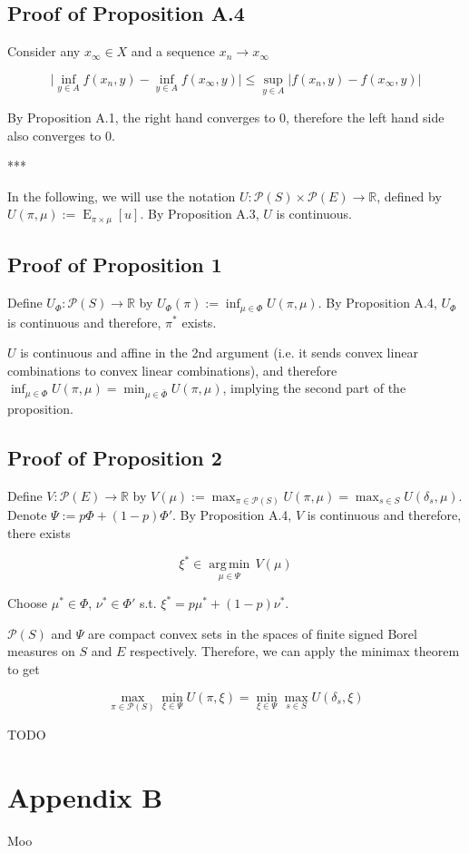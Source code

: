 \documentclass[a4paper]{article}
\DeclareMathOperator{\E}{E}
\newcommand{\Argmin}[1]{\underset{#1}{\operatorname{arg\,min}}\,}
\newcommand{\Reals}{\mathbb{R}}
\newcommand{\Abs}[1]{\lvert #1 \rvert}
\newcommand{\Prob}{\mathcal{P}}
\begin{document}
\subsection{Proof of Proposition A.4}

Consider any ${x_\infty \in X}$ and a sequence ${x_n \rightarrow x_\infty}$

$$\Abs{\inf_{y \in A} f(x_n,y) - \inf_{y \in A} f(x_\infty,y)} \leq \sup_{y \in A} \Abs{f(x_n,y) - f(x_\infty,y)}$$

By Proposition A.1, the right hand converges to 0, therefore the left hand side also converges to 0.

***

In the following, we will use the notation ${U: \Prob(S) \times \Prob(E) \rightarrow \Reals}$, defined by ${U(\pi,\mu):=\E_{\pi \times \mu}[u]}$. By Proposition A.3, ${U}$ is continuous. 

\subsection{Proof of Proposition 1}

Define ${U_\Phi: \Prob(S) \rightarrow \Reals}$ by ${U_\Phi(\pi):= \inf_{\mu \in \Phi} U(\pi,\mu)}$. By Proposition A.4, ${U_{\Phi}}$ is continuous and therefore, ${\pi^*}$ exists.

${U}$ is continuous and affine in the 2nd argument (i.e. it sends convex linear combinations to convex linear combinations), and therefore ${\inf_{\mu \in \Phi} U(\pi,\mu)=\min_{\mu \in \bar{\Phi}} U(\pi,\mu)}$, implying the second part of the proposition.

\subsection{Proof of Proposition 2}

Define ${V: \Prob(E) \rightarrow \Reals}$ by ${V(\mu):=\max_{\pi \in \Prob(S)} U(\pi,\mu)=\max_{s \in S} U(\delta_s,\mu)}$. Denote ${\Psi:=p\Phi + (1-p)\Phi'}$. By Proposition A.4, ${V}$ is continuous and therefore, there exists

$$\xi^* \in \Argmin{\mu \in \Psi} V(\mu)$$

Choose ${\mu^* \in \Phi}$, ${\nu^* \in \Phi'}$ s.t. ${\xi^* = p \mu^* + (1-p) \nu^*}$.

${\Prob(S)}$ and ${\Psi}$ are compact convex sets in the spaces of finite signed Borel measures on ${S}$ and ${E}$ respectively. Therefore, we can apply the minimax theorem to get

$$\max_{\pi \in \Prob(S)} \min_{\xi \in \Psi} U(\pi,\xi) = \min_{\xi \in \Psi} \max_{s \in S} U(\delta_s,\xi)$$

TODO

\section{Appendix B}

Moo
\end{document}
